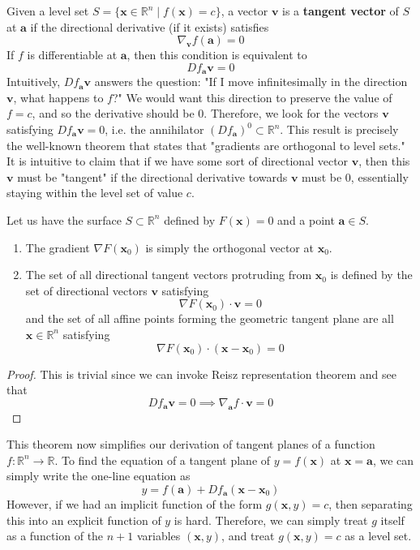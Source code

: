   Given a level set $S = \{ \mathbf{x} \in \mathbb{R}^n \mid f(\mathbf{x}) = c\}$, a vector $\mathbf{v}$ is a \textbf{tangent vector} of $S$ at $\mathbf{a}$ if the directional derivative (if it exists) satisfies
  \[\nabla_\mathbf{v} f (\mathbf{a}) = 0\]
  If $f$ is differentiable at $\mathbf{a}$, then this condition is equivalent to 
  \[D f_\mathbf{a} \mathbf{v} = 0\]
  Intuitively, $D f_\mathbf{a} \mathbf{v}$ answers the question: "If I move infinitesimally in the direction $\mathbf{v}$, what happens to $f$?" We would want this direction to preserve the value of $f = c$, and so the derivative should be $0$. Therefore, we look for the vectors $\mathbf{v}$ satisfying $D f_\mathbf{a} \mathbf{v} = 0$, i.e. the annihilator $(D f_\mathbf{a})^0 \subset \mathbb{R}^n$. This result is precisely the well-known theorem that states that "gradients are orthogonal to level sets." It is intuitive to claim that if we have some sort of directional vector $\mathbf{v}$, then this $\mathbf{v}$ must be "tangent" if the directional derivative towards $\mathbf{v}$ must be $0$, essentially staying within the level set of value $c$. 

  \begin{theorem}
  Let us have the surface $S \subset \mathbb{R}^n$ defined by $F(\mathbf{x}) = 0$ and a point $\mathbf{a} \in S$. 
  \begin{enumerate}
      \item The gradient $\nabla F(\mathbf{x}_0)$ is simply the orthogonal vector at $\mathbf{x}_0$. 
      \item The set of all directional tangent vectors protruding from $\mathbf{x}_0$ is defined by the set of directional vectors $\mathbf{v}$ satisfying 
      \[\nabla F(\mathbf{x}_0) \cdot \mathbf{v} = 0\]
      and the set of all affine points forming the geometric tangent plane are all $\mathbf{x} \in \mathbb{R}^n$ satisfying 
      \[\nabla F(\mathbf{x}_0) \cdot (\mathbf{x} - \mathbf{x}_0) = 0\]
  \end{enumerate}
  \end{theorem}
  \begin{proof}
  This is trivial since we can invoke Reisz representation theorem and see that 
  \[D f_\mathbf{a} \mathbf{v} = 0 \implies \nabla_\mathbf{a} f \cdot \mathbf{v} = 0\]
  \end{proof}

  This theorem now simplifies our derivation of tangent planes of a function $f: \mathbb{R}^n \longrightarrow \mathbb{R}$. To find the equation of a tangent plane of $y = f(\mathbf{x})$ at $\mathbf{x} = \mathbf{a}$, we can simply write the one-line equation as 
  \[y = f(\mathbf{a}) + D f_{\mathbf{a}} (\mathbf{x} - \mathbf{x}_0)\]
  However, if we had an implicit function of the form $g(\mathbf{x}, y) = c$, then separating this into an explicit function of $y$ is hard. Therefore, we can simply treat $g$ itself as a function of the $n+1$ variables $(\mathbf{x}, y)$, and treat $g(\mathbf{x}, y) = c$ as a level set. 

